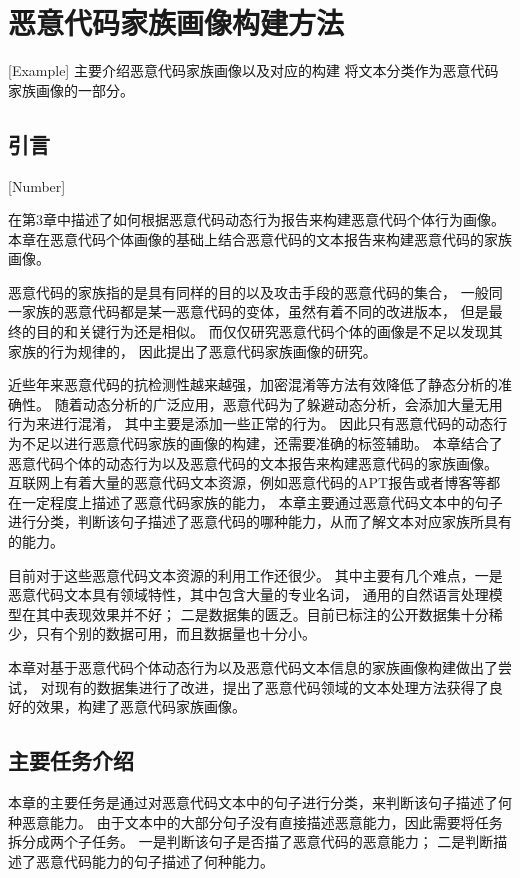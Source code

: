 
\chapter{恶意代码家族画像构建方法}[Example]
主要介绍恶意代码家族画像以及对应的构建
将文本分类作为恶意代码家族画像的一部分。
\section{引言}[Number]

在第3章中描述了如何根据恶意代码动态行为报告来构建恶意代码个体行为画像。
本章在恶意代码个体画像的基础上结合恶意代码的文本报告来构建恶意代码的家族画像。

恶意代码的家族指的是具有同样的目的以及攻击手段的恶意代码的集合，
一般同一家族的恶意代码都是某一恶意代码的变体，虽然有着不同的改进版本，
但是最终的目的和关键行为还是相似。
而仅仅研究恶意代码个体的画像是不足以发现其家族的行为规律的，
因此提出了恶意代码家族画像的研究。

近些年来恶意代码的抗检测性越来越强，加密混淆等方法有效降低了静态分析的准确性。
随着动态分析的广泛应用，恶意代码为了躲避动态分析，会添加大量无用行为来进行混淆，
其中主要是添加一些正常的行为\cite{RN33}。
因此只有恶意代码的动态行为不足以进行恶意代码家族的画像的构建，还需要准确的标签辅助。
本章结合了恶意代码个体的动态行为以及恶意代码的文本报告来构建恶意代码的家族画像。
互联网上有着大量的恶意代码文本资源，例如恶意代码的APT报告或者博客等都在一定程度上描述了恶意代码家族的能力，
本章主要通过恶意代码文本中的句子进行分类，判断该句子描述了恶意代码的哪种能力，从而了解文本对应家族所具有的能力。


目前对于这些恶意代码文本资源的利用工作还很少。
其中主要有几个难点，一是恶意代码文本具有领域特性，其中包含大量的专业名词，
通用的自然语言处理模型在其中表现效果并不好；
二是数据集的匮乏。目前已标注的公开数据集十分稀少，只有个别的数据可用，而且数据量也十分小。


本章对基于恶意代码个体动态行为以及恶意代码文本信息的家族画像构建做出了尝试，
对现有的数据集进行了改进，提出了恶意代码领域的文本处理方法获得了良好的效果，构建了恶意代码家族画像。



\section{主要任务介绍}
本章的主要任务是通过对恶意代码文本中的句子进行分类，来判断该句子描述了何种恶意能力。
由于文本中的大部分句子没有直接描述恶意能力，因此需要将任务拆分成两个子任务。
一是判断该句子是否描了恶意代码的恶意能力；
二是判断描述了恶意代码能力的句子描述了何种能力。


